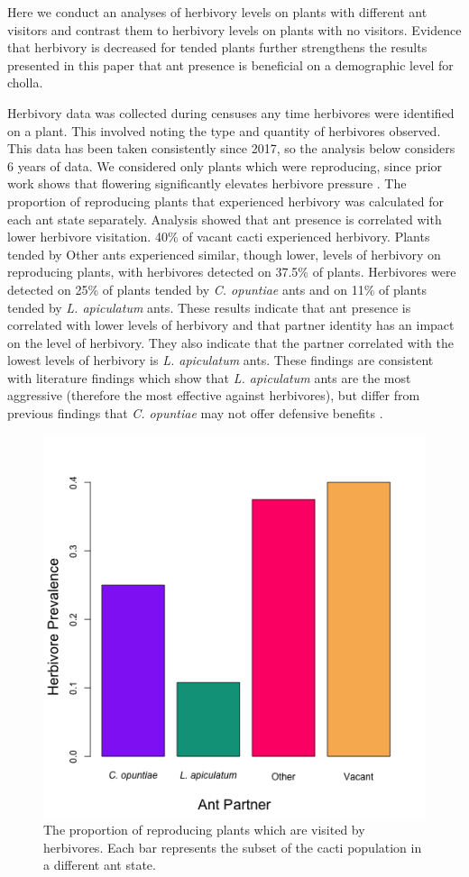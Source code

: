 \documentclass[11pt]{article}
\begin{document}
Here we conduct  an analyses of herbivory levels on plants with different ant visitors and contrast them to herbivory levels on plants with no visitors.
Evidence that herbivory is decreased for tended plants further strengthens the results presented in this paper that ant presence is beneficial on a demographic level for cholla.

Herbivory data was collected during censuses any time herbivores were identified on a plant. 
This involved noting the type and quantity of herbivores observed. 
This data has been taken consistently since 2017, so the analysis below considers 6 years of data.
We considered only plants which were reproducing, since prior work shows that flowering significantly elevates herbivore pressure \citep{Miller2006}.
The proportion of reproducing plants that experienced herbivory was calculated for each ant state separately.
Analysis showed that ant presence is correlated with lower herbivore visitation.
40\% of vacant cacti experienced herbivory.
Plants tended by Other ants experienced similar, though lower, levels of herbivory on reproducing plants, with herbivores detected on 37.5\% of plants.
Herbivores were detected on 25\% of plants tended by \textit{C. opuntiae} ants and on 11\% of plants tended by \textit{L. apiculatum} ants.
These results indicate that ant presence is correlated with lower levels of herbivory and that partner identity has an impact on the level of herbivory.
They also indicate that the partner correlated with the lowest levels of herbivory is \textit{L. apiculatum} ants.
These findings are consistent with literature findings which show that \textit{L. apiculatum} ants are the most aggressive (therefore the most effective against herbivores), but differ from previous findings that \textit{C. opuntiae} may not offer defensive benefits \citep{Miller2007}.

\renewcommand{\thefigure}{A\arabic{figure}}

\begin{figure}[H]
	\includegraphics[width=0.7\linewidth]{Figures/herb_all.png}
	\caption{The proportion of reproducing plants which are visited by herbivores. Each bar represents the subset of the cacti population in a different ant state.  }
	\label{app:herb}
\end{figure}
\end{document}
